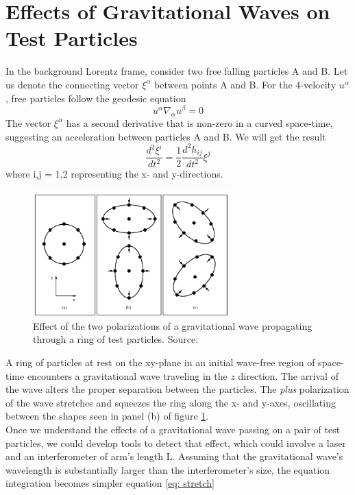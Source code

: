 \section{Effects of Gravitational Waves on Test Particles}
In the background Lorentz frame, consider two free falling particles A and B.
Let us denote the connecting vector $\xi^{\alpha}$ between points A and B. For the 4-velocity $u^{\alpha}$, free particles follow the geodesic equation \citep{misner2017gravitation}\citep{thesis}\citep{Generalrelativity}
\begin{equation}
    u^{\alpha}\nabla_{\alpha}u^{\beta} = 0
\end{equation}
The vector $\xi^{\alpha}$ has a second derivative that is non-zero in a curved space-time, suggesting an acceleration between particles A and B. We will get the result
\begin{equation}
    \frac{d^{2}\xi^{i}}{dt^{2}} = \frac{1}{2} \frac{d^{2}h_{ij}}{dt^{2}} \xi^{j}
    \label{eq: stretch}
\end{equation}
where i,j = 1,2 representing the x- and y-directions.
\begin{figure}[h]
    \centering
    \includegraphics[width=3in]{images_/stretch.png}
    \caption{Effect of the two polarizations of a gravitational wave propagating through a ring of test particles. Source: \citep{doi:10.1142/9789813141766_0001} }
    \label{fig: stretch}
\end{figure}
A ring of particles at rest on the xy-plane in an initial wave-free region of space-time encounters a gravitational wave traveling in the $z$ direction. The arrival of the wave alters the proper separation between the particles. The \textit{plus} polarization of the wave stretches and squeezes the ring along the x- and y-axes, oscillating between the shapes seen in panel (b) of figure \ref{fig: stretch}.\\
Once we understand the effects of a gravitational wave passing on a pair of test particles, we could develop tools to detect that effect, which could involve a laser and an interferometer of arm's length L. Assuming that the gravitational wave's wavelength is substantially larger than the interferometer's size, the equation integration becomes simpler equation \ref{eq: stretch}
